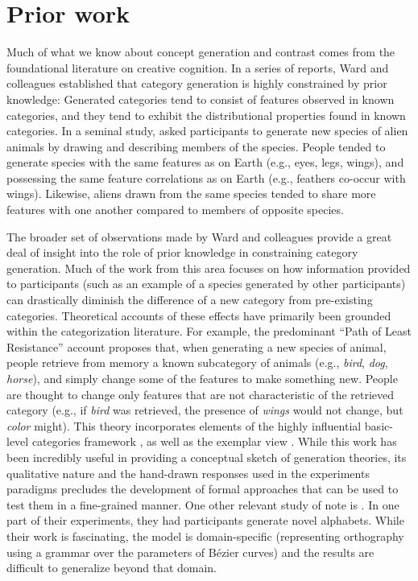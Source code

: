 \documentclass[pdflatex,sn-apa]{sn-jnl}%
\theoremstyle{thmstyleone}%
\theoremstyle{thmstyletwo}%
\theoremstyle{thmstylethree}%
\begin{document}
\section{Prior work}

Much of what we know about concept generation and contrast comes from the
foundational literature on creative cognition. In a series of reports, Ward and
colleagues
\citep{ward1995s,ward1994structured,marsh1999inadvertent,ward2002role,smith1993constraining}
established that category generation is highly constrained by prior knowledge:
Generated categories tend to consist of features observed in known categories,
and they tend to exhibit the distributional properties found in known
categories. In a seminal study, \cite{ward1994structured} asked participants to
generate new species of alien animals by drawing and describing members of the
species. People tended to generate species with the same features as on Earth
(e.g., eyes, legs, wings), and possessing the same feature correlations as on
Earth (e.g., feathers co-occur with wings). Likewise, aliens drawn from the same
species tended to share more features with one another compared to members of
opposite species.

The broader set of observations made by Ward and colleagues provide a great deal
of insight into the role of prior knowledge in constraining category generation.
Much of the work from this area
\citep[e.g.,][]{smith1993constraining,marsh1999inadvertent} focuses on how
information provided to participants (such as an example of a species generated
by other participants) can drastically diminish the difference of a new category
from pre-existing categories. Theoretical accounts of these effects have
primarily been grounded within the categorization literature. For example, the
predominant ``Path of Least Resistance'' account
\citep[see][]{ward1994structured,ward1995s,ward2002role} proposes that, when
generating a new species of animal, people retrieve from memory a known
subcategory of animals (e.g., {\em bird}, {\em dog}, {\em horse}), and simply
change some of the features to make something new. People are thought to change
only features that are not characteristic of the retrieved category (e.g., if
{\em bird} was retrieved, the presence of {\em wings} would not change, but {\em color} might). This theory incorporates elements of the highly influential
basic-level categories framework \citep{rosch1975cognitive,rosch1976basic}, as
well as the exemplar view \citep{medin1978context,brooks1978nonanalytic}. While
this work has been incredibly useful in providing a conceptual sketch of
generation theories, its qualitative nature and the hand-drawn responses used in
the experiments paradigms precludes the development of formal approaches that
can be used to test them in a fine-grained manner. One other relevant study of note is \cite{lake2015}. In one part of their experiments, they had participants generate novel alphabets. While their work is fascinating, the model is domain-specific (representing orthography using a grammar over the parameters of B\'{e}zier curves) and the results are difficult to generalize beyond that domain.
\end{document}
